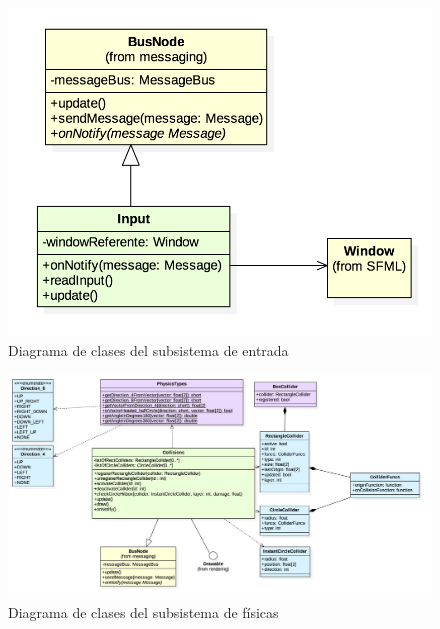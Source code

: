 \begin{figure}
	\centerline{\includegraphics[width=12cm]{otros/UML/png/alld/png/input__diagramaDeClases_input_8.png}}
	\caption{Diagrama de clases del subsistema de entrada}
	\label{class:input}
\end{figure}

\begin{figure}
	\centerline{\includegraphics[width=18cm]{otros/UML/png/alld/png/physics__diagramaDeClases_physics_2.png}}
	\caption{Diagrama de clases del subsistema de físicas}
	\label{class:collisions}
\end{figure}


